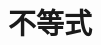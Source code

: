 \documentclass[12pt,UTF8,fontset=none]{ctexbook}
\begin{document}








\chapter{不等式}
\end{document}
